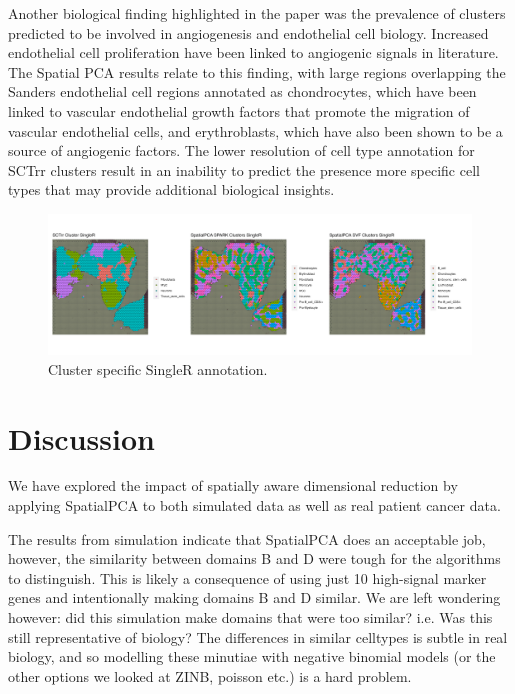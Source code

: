 \documentclass{article}
\begin{document}
Another biological finding highlighted in the \citet{sanders_small_2022} paper was the prevalence of clusters predicted to be involved in angiogenesis and endothelial cell biology. Increased endothelial cell proliferation have been linked to angiogenic signals in literature\citep{munoz-chapuli_angiogenesis_2004}. The Spatial PCA results relate to this finding, with large regions overlapping the Sanders endothelial cell regions annotated as chondrocytes, which have been linked to vascular endothelial growth factors that promote the migration of vascular endothelial cells\citep{xiaoshi_setd7_2021}, and erythroblasts, which have also been shown to be a source of angiogenic factors. The lower resolution of cell type annotation for SCTrr clusters result in an inability to predict the presence more specific cell types that may provide additional biological insights.

\begin{figure}[h!]
    \centering
    \includegraphics[width=\textwidth]{images/SRCluster_D_GTFB1170_SmallCellOvarianCancer_pw_sq.png}
    \caption{Cluster specific SingleR annotation.}
    \label{fig:SRCluster}
\end{figure}

\section*{Discussion}

We have explored the impact of spatially aware dimensional reduction by applying SpatialPCA to both simulated data as well as real patient cancer data.

The results from simulation indicate that SpatialPCA does an acceptable job, however, the similarity between domains B and D were tough for the algorithms to distinguish. This is likely a consequence of using just 10 high-signal marker genes and intentionally making domains B and D similar. We are left wondering however: did this simulation make domains that were too similar? i.e. Was this still representative of biology? The differences in similar celltypes is subtle in real biology, and so modelling these minutiae with negative binomial models (or the other options we looked at ZINB, poisson etc.) is a hard problem. 
\end{document}
